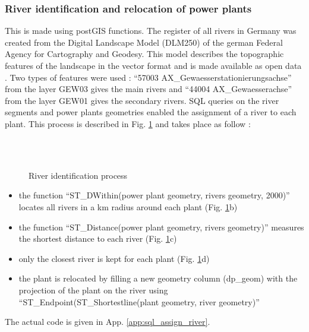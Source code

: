 \subsubsection*{River identification and relocation of power plants}

This is made using postGIS functions. The register of all rivers in Germany was created from the Digital Landscape Model (DLM250) of the german Federal Agency for Cartography and Geodesy. This model describes the topographic features of the landscape in the vector format and is made available as open data \cite{dlm250}. \newline Two types of features were used : ``57003 AX{\_}Gewaesserstationierungsachse'' from the layer GEW03 gives the main rivers and ``44004 AX{\_}Gewaesserachse'' from the layer GEW01 gives the secondary rivers. \newline 
SQL queries on the river segments and power plants geometries enabled the assignment of a river to each plant. This process is described in Fig. \ref{river_id} and takes place as follow : 

\begin{figure}[H]
\begin{center}
   \hspace{3cm}
   \\
   \hspace{3cm}
   \\ 
\end{center}
\caption{River identification process}
\label{river_id}
\end{figure}

\begin{itemize}
 \item the function ``ST{\_}DWithin(power plant geometry, rivers geometry, 2000)'' locates all rivers in a \unit[2]{km} radius around each plant (Fig. \ref{river_id}b)
 \item the function ``ST{\_}Distance(power plant geometry, rivers geometry)'' measures the  shortest distance to each river (Fig. \ref{river_id}c)
 \item only the closest river is kept for each plant (Fig. \ref{river_id}d)
 \item the plant is relocated by filling a new geometry column (dp{\_}geom) with the projection of the plant on the river using ``ST{\_}Endpoint(ST{\_}Shortestline(plant geometry, river geometry)''
\end{itemize}
The actual code is given in App. \ref{app:sql_assign_river}.

